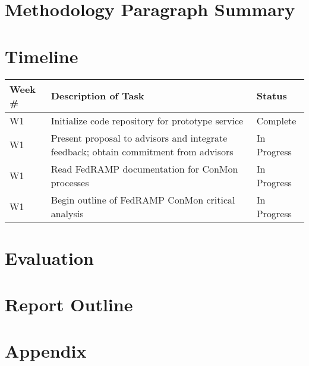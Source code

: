 \documentclass{jdf}
\begin{document}
\section*{Methodology Paragraph Summary}

\section*{Timeline}

\begin{table}[h]
\begin{tabularx}{\textwidth}{|l|X|l|}
    \hline
    Week \# & Description of Task & Status \\ [0.5ex] 
    \hline
    W1 & Initialize code repository for prototype service & Complete \\
    \hline
    W1 & Present proposal to advisors and integrate feedback; obtain commitment from advisors & In Progress \\
    \hline
    W1 & Read FedRAMP documentation for ConMon processes & In Progress \\
    \hline
    W1 & Begin outline of FedRAMP ConMon critical analysis & In Progress \\
    \hline
\end{tabularx}
\end{table}

\section*{Evaluation}

\section*{Report Outline}

\nocite{*}



\section*{Appendix}
\end{document}
